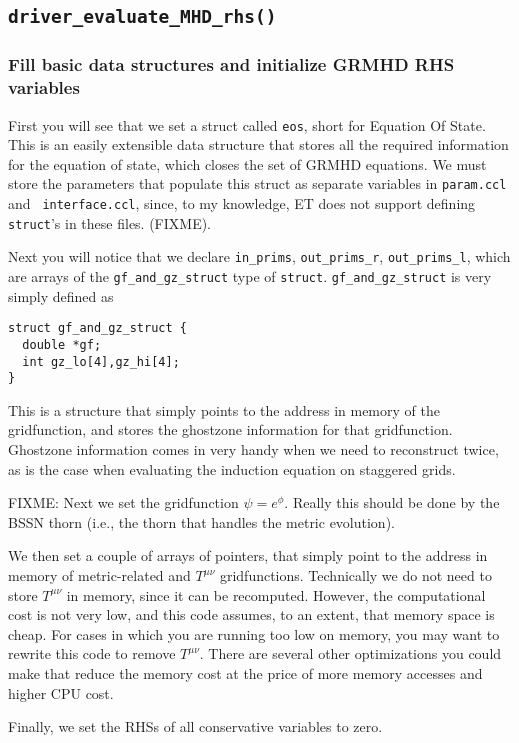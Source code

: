 \documentclass[showpacs,amsmath,amssymb,prd]{revtex4}
\begin{document}
\subsection{{\tt driver\_evaluate\_MHD\_rhs()}}

\subsubsection{Fill basic data structures and initialize GRMHD RHS variables}
First you will see that we set a struct called {\tt eos}, short for
Equation Of State. This is an easily extensible data structure that
stores all the required information for the equation of state, which
closes the set of GRMHD equations. We must store the parameters that
populate this struct as separate variables in {\tt param.ccl} and {\tt
  interface.ccl}, since, to my knowledge, ET does not support defining
{\tt struct}'s in these files. (FIXME).

Next you will notice that we declare {\tt in\_prims}, {\tt out\_prims\_r},
{\tt out\_prims\_l}, which are arrays of the {\tt gf\_and\_gz\_struct}
type of {\tt struct}. {\tt gf\_and\_gz\_struct} is very simply defined as 
\begin{verbatim}
struct gf_and_gz_struct {
  double *gf;
  int gz_lo[4],gz_hi[4];
}
\end{verbatim}
This is a structure that simply points to the address in memory of
the gridfunction, and stores the ghostzone information for that
gridfunction. Ghostzone information comes in very handy when we need
to reconstruct twice, as is the case when evaluating the induction
equation on staggered grids.

FIXME: Next we set the gridfunction $\psi=e^{\phi}$. Really this
should be done by the BSSN thorn (i.e., the thorn that handles the
metric evolution).

We then set a couple of arrays of pointers, that simply point to the
address in memory of metric-related and $T^{\mu\nu}$
gridfunctions. Technically we do not need to store $T^{\mu\nu}$ in
memory, since it can be recomputed. However, the computational cost is
not very low, and this code assumes, to an extent, that memory space
is cheap. For cases in which you are running too low on memory,
you may want to rewrite this code to remove $T^{\mu\nu}$. There are
several other optimizations you could make that reduce the memory cost
at the price of more memory accesses and higher CPU cost.

Finally, we set the RHSs of all conservative variables to zero.
\end{document}
